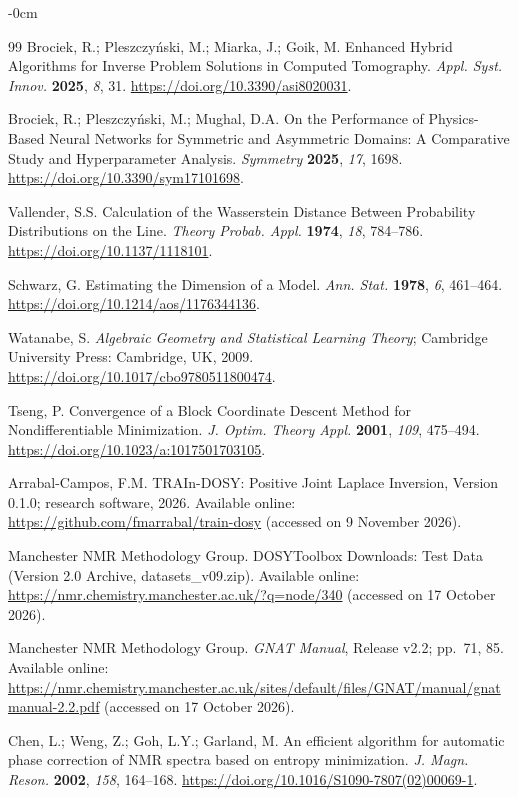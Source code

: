 \documentclass[mathematics,article,accept,moreauthors]{Definitions/mdpi}
\begin{document}
\begin{adjustwidth}{-\extralength}{0cm}
\begin{thebibliography}{99}
Brociek, R.; Pleszczy\'nski, M.; Miarka, J.; Goik, M. Enhanced Hybrid Algorithms for Inverse Problem Solutions in Computed Tomography. \emph{Appl. Syst. Innov.} \textbf{2025}, \emph{8}, 31. \url{https://doi.org/10.3390/asi8020031}.

Brociek, R.; Pleszczy\'nski, M.; Mughal, D.A. On the Performance of Physics-Based Neural Networks for Symmetric and Asymmetric Domains: A Comparative Study and Hyperparameter Analysis. \emph{Symmetry} \textbf{2025}, \emph{17}, 1698. \url{https://doi.org/10.3390/sym17101698}.

Vallender, S.S. Calculation of the Wasserstein Distance Between Probability Distributions on the Line. \emph{Theory Probab. Appl.} \textbf{1974}, \emph{18}, 784--786. \url{https://doi.org/10.1137/1118101}.

Schwarz, G. Estimating the Dimension of a Model. \emph{Ann. Stat.} \textbf{1978}, \emph{6}, 461--464. \url{https://doi.org/10.1214/aos/1176344136}.

Watanabe, S. \emph{Algebraic Geometry and Statistical Learning Theory}; Cambridge University Press: Cambridge, UK, 2009. \url{https://doi.org/10.1017/cbo9780511800474}.

Tseng, P. Convergence of a Block Coordinate Descent Method for Nondifferentiable Minimization. \emph{J. Optim. Theory Appl.} \textbf{2001}, \emph{109}, 475--494. \url{https://doi.org/10.1023/a:1017501703105}.

Arrabal-Campos, F.M. TRAIn-DOSY: Positive Joint Laplace Inversion, Version 0.1.0; research software, 2026. Available online: \url{https://github.com/fmarrabal/train-dosy} (accessed on 9 November 2026).

Manchester NMR Methodology Group. DOSYToolbox Downloads: Test Data (Version 2.0 Archive, datasets\_v09.zip).
Available online: \url{https://nmr.chemistry.manchester.ac.uk/?q=node/340}
(accessed on 17 October 2026).


Manchester NMR Methodology Group. \textit{GNAT Manual}, Release v2.2; pp.~71, 85. 
Available online: \url{https://nmr.chemistry.manchester.ac.uk/sites/default/files/GNAT/manual/gnatmanual-2.2.pdf}
(accessed on 17 October 2026).

Chen, L.; Weng, Z.; Goh, L.Y.; Garland, M.
An efficient algorithm for automatic phase correction of NMR spectra based on entropy minimization.
\textit{J. Magn. Reson.} \textbf{2002}, \textit{158}, 164--168.
\url{https://doi.org/10.1016/S1090-7807(02)00069-1}.

\end{thebibliography}
\PublishersNote{}
\end{adjustwidth}
\end{document}
